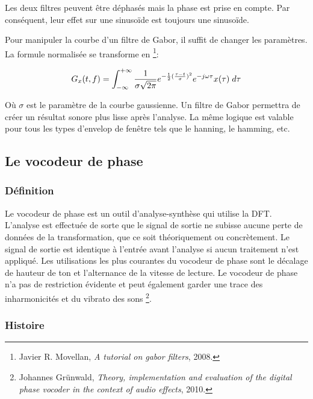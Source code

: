 Les deux filtres peuvent être déphasés mais la phase est prise en compte. Par conséquent, leur effet sur une sinusoïde est toujours une sinusoïde.

Pour manipuler la courbe d'un filtre de Gabor, il suffit de changer les paramètres. La formule normalisée se transforme en \footnote{Javier R. Movellan, \textit{A tutorial on gabor filters}, 2008. \nocite{Tut2002}}:

\begin{equation}
    G_x(t,f) = \int_{-\infty}^{+\infty} \frac{1}{\sigma \sqrt{2 \pi}} e ^ {-\frac{1}{2}(\frac{\tau-t}{\sigma})^2} e ^ {-j\omega \tau} x(\tau)\hspace{1mm} d\tau  
\end{equation}

Où $ \sigma $ est le paramètre de la courbe gaussienne. Un filtre de Gabor permettra de créer un résultat sonore plus lisse après l'analyse. La même logique est valable pour tous les types d’envelop de fenêtre tels que le hanning, le hamming, etc.

    \subsection{Le vocodeur de phase}    
    
        \subsubsection{Définition}   

Le vocodeur de phase est un outil d'analyse-synthèse qui utilise la DFT. L'analyse est effectuée de sorte que le signal de sortie ne subisse aucune perte de données de la transformation, que ce soit théoriquement ou concrètement. Le signal de sortie est identique à l'entrée avant l'analyse si aucun traitement n'est appliqué. Les utilisations les plus courantes du vocodeur de phase sont le décalage de hauteur de ton et l’alternance de la vitesse de lecture. Le vocodeur de phase n’a pas de restriction évidente et peut également garder une trace des inharmonicités et du vibrato des sons \footnote{Johannes Grünwald, \textit{Theory, implementation and evaluation of the digital phase vocoder in the context of audio effects}, 2010. \nocite{GR10} }.

        \subsubsection{Histoire} 

